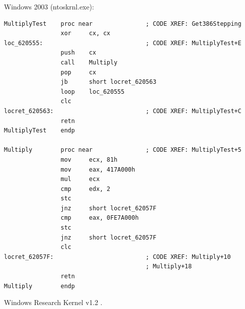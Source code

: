  Windows 2003 
(ntoskrnl.exe):

\begin{lstlisting}
MultiplyTest    proc near               ; CODE XREF: Get386Stepping
                xor     cx, cx
loc_620555:                             ; CODE XREF: MultiplyTest+E
                push    cx
                call    Multiply
                pop     cx
                jb      short locret_620563
                loop    loc_620555
                clc
locret_620563:                          ; CODE XREF: MultiplyTest+C
                retn
MultiplyTest    endp

Multiply        proc near               ; CODE XREF: MultiplyTest+5
                mov     ecx, 81h
                mov     eax, 417A000h
                mul     ecx
                cmp     edx, 2
                stc
                jnz     short locret_62057F
                cmp     eax, 0FE7A000h
                stc
                jnz     short locret_62057F
                clc
locret_62057F:                          ; CODE XREF: Multiply+10
                                        ; Multiply+18
                retn
Multiply        endp
\end{lstlisting}

Windows Research Kernel v1.2 
.



\section{}


